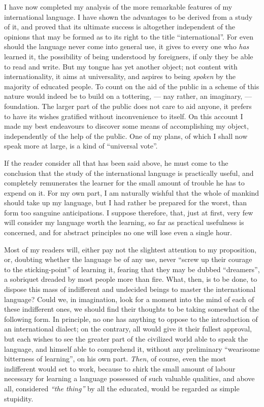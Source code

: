 
I have now completed my analysis of the more remarkable features of my international language. I have shown the advantages to be derived from a study of it, and proved that its ultimate success is altogether independent of the opinions that may be formed as to its right to the title “international”. For even should the language never come into general use, it gives to every one who \emph{has} learned it, the possibility of being understood by foreigners, if only they be able to read and write. But my tongue has yet another object; not content with internationality, it aims at universality, and aspires to being \emph{spoken} by the majority of educated people. To count on the aid of the public in a scheme of this nature would indeed be to build on a tottering, --- nay rather, an imaginary, --- foundation. The larger part of the public does not care to aid anyone, it prefers to have its wishes gratified without inconvenience to itself. On this account I made my best endeavours to discover some means of accomplishing my object, independently of the help of the public. One of my plans, of which I shall now speak more at large, is a kind of “universal vote”.

If the reader consider all that has been said above, he must come to the conclusion that the study of the international language is practically useful, and completely remunerates the learner for the small amount of trouble he has to expend on it. For my own part, I am naturally wishful that the whole of mankind should take up my language, but I had rather be prepared for the worst, than form too sanguine anticipations. I suppose therefore, that, just at first, very few will consider my language worth the learning, so far as practical usefulness is concerned, and for abstract principles no one will lose even a single hour.

Most of my readers will, either pay not the slightest attention to my proposition, or, doubting whether the language be of any use, never “screw up their courage to the sticking-point” of learning it, fearing that they may be dubbed “dreamers”, a sobriquet dreaded by most people more than fire. What, then, is to be done, to dispose this mass of indifferent and undecided beings to master the international language? Could we, in imagination, look for a moment into the mind of each of these indifferent ones, we should find their thoughts to be taking somewhat of the following form. In principle, no one has anything to oppose to the introduction of an international dialect; on the contrary, all would give it their fullest approval, but each wishes to see the greater part of the civilized world able to speak the language, and himself able to comprehend it, without any preliminary “wearisome bitterness of learning”, on his own part. \emph{Then}, of course, even the most indifferent would set to work, because to shirk the small amount of labour necessary for learning a language possessed of such valuable qualities, and above all, considered \emph{``the thing''} by all the educated, would be regarded as simple stupidity.

